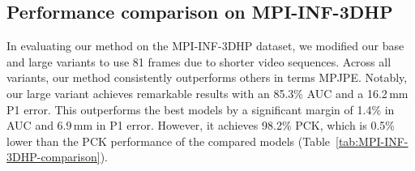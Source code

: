 \documentclass[10pt,twocolumn,letterpaper]{article}
\begin{document}
    \subsection{Performance comparison on MPI-INF-3DHP}
    In evaluating our method on the MPI-INF-3DHP dataset, we modified our base and large variants to use 81 frames due to shorter video sequences. Across all variants, our method consistently outperforms others in terms MPJPE. Notably, our large variant achieves remarkable results with an 85.3\% AUC and a 16.2\,mm P1 error. This outperforms the best models by a significant margin of 1.4\% in AUC and 6.9\,mm in P1 error. However, it achieves 98.2\% PCK, which is 0.5\% lower than the PCK performance of the compared models (Table~\ref{tab:MPI-INF-3DHP-comparison}).
    \begin{table}[h]\small
    \caption{Quantitative comparisons on MPI-INF-3DHP. : Number of input frames. The best and second-best scores are in bold and underlined, respectively.}
      \centering
    \label{tab:MPI-INF-3DHP-comparison}
    \end{table}
\end{document}
